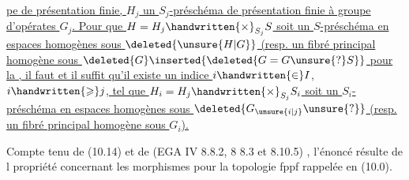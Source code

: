 \uline{pe de présentation finie, $H_j$ un $S_j$-préschéma de présentation finie à groupe d'opérates $G_j$. Pour que $H=H_j\handwritten{\times}_{S_j}S$ soit un $S$-préschéma en espaces homogènes sous $\deleted{\unsure{H|G}}$}\uline{ (resp. un fibré principal homogène sous $\deleted{G}\inserted{\deleted{G=G\unsure{?}S}}$\unsure{,|),} pour la }\uline{, il faut et il suffit qu'il existe un indice $i\handwritten{\in}I$, $i\handwritten{\geqslant}j$, tel que $H_i=H_j\handwritten{\times}_{S_j}S_i$ soit un $S_i$-préschéma en espaces homogènes sous $\deleted{G_{\unsure{i|j}}\unsure{?}}$}\uline{ (resp. un fibré principal homogène sous $G_i$).}

Compte tenu de (10.14) et de (EGA IV 8.8.2, 8 8.3 et 8.10.5) ,  l'énoncé résulte de l propriété concernant les morphismes  pour la topologie fppf rappelée en (10.0).

